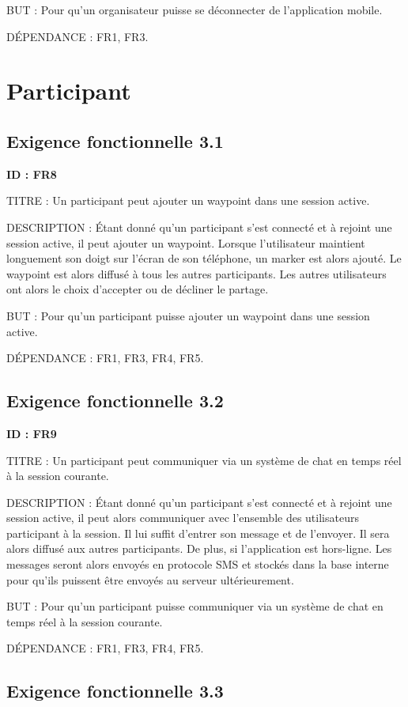 \documentclass[titlepage, 12pt]{report}
\begin{document}
BUT : Pour qu'un organisateur puisse se déconnecter de l'application mobile.

DÉPENDANCE : FR1, FR3.

\section{Participant}

\subsection{Exigence fonctionnelle 3.1}

\textbf{ID : FR8}

TITRE : Un participant peut ajouter un waypoint dans une session active.

DESCRIPTION : Étant donné qu'un participant s'est connecté et à rejoint une session active, il peut ajouter un waypoint. Lorsque l'utilisateur maintient longuement son doigt sur l'écran de son téléphone, un marker est alors ajouté. Le waypoint est alors diffusé à tous les autres participants. Les autres utilisateurs ont alors le choix d'accepter ou de décliner le partage.

BUT : Pour qu'un participant puisse ajouter un waypoint dans une session active.

DÉPENDANCE : FR1, FR3, FR4, FR5.

\subsection{Exigence fonctionnelle 3.2}

\textbf{ID : FR9}

TITRE : Un participant peut communiquer via un système de chat en temps réel à la session courante.

DESCRIPTION : Étant donné qu'un participant s'est connecté et à rejoint une session active, il peut alors communiquer avec l'ensemble des utilisateurs participant à la session. Il lui suffit d'entrer son message et de l'envoyer. Il sera alors diffusé aux autres participants.
De plus, si l'application est hors-ligne. Les messages seront alors envoyés en protocole SMS et stockés dans la base interne pour qu'ils puissent être envoyés au serveur ultérieurement. 

BUT : Pour qu'un participant puisse communiquer via un système de chat en temps réel à la session courante.

DÉPENDANCE : FR1, FR3, FR4, FR5.

\subsection{Exigence fonctionnelle 3.3}
\end{document}
